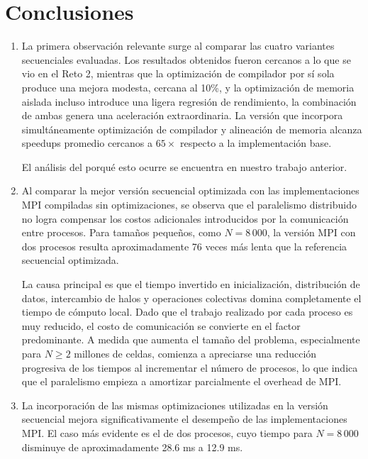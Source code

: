 
\section{Conclusiones}
\label{sec:Conclusiones}

\begin{enumerate}

\item

La primera observación relevante surge al comparar las cuatro variantes secuenciales evaluadas. Los resultados obtenidos fueron cercanos a lo que se vio en el Reto 2, mientras que la optimización de compilador por sí sola produce una mejora modesta, cercana al 10\%, y la optimización de memoria aislada incluso introduce una ligera regresión de rendimiento, la combinación de ambas genera una aceleración extraordinaria. La versión que incorpora simultáneamente optimización de compilador y alineación de memoria alcanza speedups promedio cercanos a $65\times$ respecto a la implementación base.

El análisis del porqué esto ocurre se encuentra en nuestro trabajo anterior.

\item

Al comparar la mejor versión secuencial optimizada con las implementaciones MPI compiladas sin optimizaciones, se observa que el paralelismo distribuido no logra compensar los costos adicionales introducidos por la comunicación entre procesos. Para tamaños pequeños, como $N=8\,000$, la versión MPI con dos procesos resulta aproximadamente 76 veces más lenta que la referencia secuencial optimizada.

La causa principal es que el tiempo invertido en inicialización, distribución de datos, intercambio de halos y operaciones colectivas domina completamente el tiempo de cómputo local. Dado que el trabajo realizado por cada proceso es muy reducido, el costo de comunicación se convierte en el factor predominante. A medida que aumenta el tamaño del problema, especialmente para $N \geq 2$ millones de celdas, comienza a apreciarse una reducción progresiva de los tiempos al incrementar el número de procesos, lo que indica que el paralelismo empieza a amortizar parcialmente el overhead de MPI.

\item

La incorporación de las mismas optimizaciones utilizadas en la versión secuencial mejora significativamente el desempeño de las implementaciones MPI. El caso más evidente es el de dos procesos, cuyo tiempo para $N=8\,000$ disminuye de aproximadamente 28.6 ms a 12.9 ms.


\end{enumerate}
